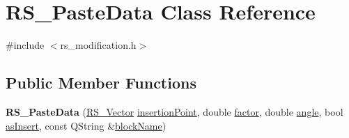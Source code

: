 \hypertarget{classRS__PasteData}{\section{R\-S\-\_\-\-Paste\-Data Class Reference}
\label{classRS__PasteData}
}


{\ttfamily \#include $<$rs\-\_\-modification.\-h$>$}

\subsection*{Public Member Functions}
\begin{DoxyCompactItemize}
\item 
\hypertarget{classRS__PasteData_ad152dcaa201a9ddfdc8d5703cdeba02c}{{\bfseries R\-S\-\_\-\-Paste\-Data} (\hyperlink{classRS__Vector}{R\-S\-\_\-\-Vector} \hyperlink{classRS__PasteData_ae979331a3fbb6db929d764106a64023c}{insertion\-Point}, double \hyperlink{classRS__PasteData_a2b49b40f1313e982e1f3e56acd8d9cc3}{factor}, double \hyperlink{classRS__PasteData_ac28460107d1902d713979277887b482d}{angle}, bool \hyperlink{classRS__PasteData_a631f78a509532db1c214321381ccf443}{as\-Insert}, const Q\-String \&\hyperlink{classRS__PasteData_aefa5f620da17ef80f4a695d3934f2558}{block\-Name})}\label{classRS__PasteData_ad152dcaa201a9ddfdc8d5703cdeba02c}

\end{DoxyCompactItemize}

